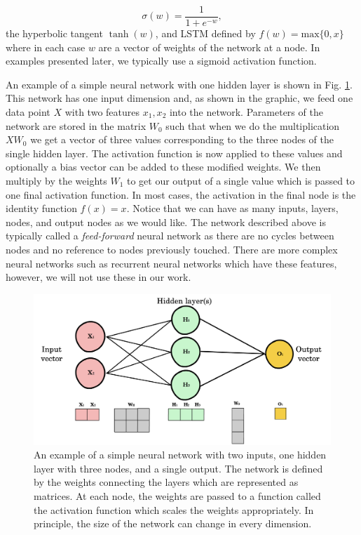 \documentclass{CUP-JNL-DTM}%
\theoremstyle{definition}
\numberwithin{equation}{section}
\begin{document}
\begin{equation}
    \sigma(w) = \frac{1}{1 + e^{-w}},
\end{equation}
the hyperbolic tangent $\tanh(w)$, and LSTM defined by $f(w) = \textrm{max}\{0,x\}$ where in each case $w$ are a vector of weights of the network at a node. In examples presented later, we typically use a sigmoid activation function. 

An example of a simple neural network with one hidden layer is shown in Fig. \ref{fig:NNexample}. This network has one input dimension and, as shown in the graphic, we feed one data point $X$ with two features $x_1, x_2$ into the network. Parameters of the network are stored in the matrix $W_0$ such that when we do the multiplication $X W_0$ we get a vector of three values corresponding to the three nodes of the single hidden layer. The activation function is now applied to these values and optionally a bias vector can be added to these modified weights. We then multiply by the weights $W_1$ to get our output of a single value which is passed to one final activation function. In most cases, the activation in the final node is the identity function $f(x) = x$. Notice that we can have as many inputs, layers, nodes, and output nodes as we would like. The network described above is typically called a \emph{feed-forward} neural network as there are no cycles between nodes and no reference to nodes previously touched. There are more complex neural networks such as recurrent neural networks which have these features, however, we will not use these in our work.

\begin{figure}
\centering
\includegraphics[width=0.7\linewidth]{figures/NN_example.png}
\caption{An example of a simple neural network with two inputs, one hidden layer with three nodes, and a single output. The network is defined by the weights connecting the layers which are represented as matrices. At each node, the weights are passed to a function called the activation function which scales the weights appropriately. In principle, the size of the network can change in every dimension. }
\label{fig:NNexample}
\end{figure}
\end{document}
